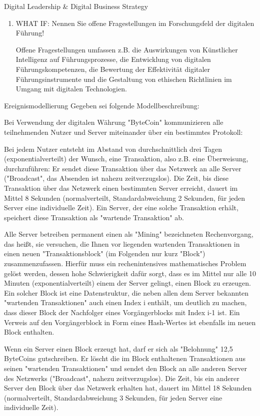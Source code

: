 \documentclass{article}
\begin{document}
\begin{exercise}{Digital Leadership \& Digital Business Strategy}
\begin{enumerate}
    \item WHAT IF: Nennen Sie offene Fragestellungen im Forschungsfeld der digitalen Führung!
          \begin{solution}
            Offene Fragestellungen umfassen z.B. die Auswirkungen von Künstlicher Intelligenz auf Führungsprozesse, die Entwicklung von digitalen Führungskompetenzen, die Bewertung der Effektivität digitaler Führungsinstrumente und die Gestaltung von ethischen Richtlinien im Umgang mit digitalen Technologien.
          \end{solution}
  \end{enumerate}
\end{exercise}



\begin{exercise}{Ereignismodellierung}
  Gegeben sei folgende Modellbeschreibung:
  \par Bei Verwendung der digitalen Währung "ByteCoin" kommunizieren alle teilnehmenden Nutzer und Server miteinander über ein bestimmtes Protokoll:
  \par Bei jedem Nutzer entsteht im Abstand von durchschnittlich drei Tagen (exponentialverteilt) der Wunsch, eine Transaktion, also z.B. eine Überweisung, durchzuführen: Er sendet diese Transaktion über das Netzwerk an alle Server ("Broadcast", das Absenden ist nahezu zeitverzugslos). Die Zeit, bis diese Transaktion über das Netzwerk einen bestimmten Server erreicht, dauert im Mittel 8 Sekunden (normalverteilt, Standardabweichung 2 Sekunden, für jeden Server eine individuelle Zeit). Ein Server, der eine solche Transaktion erhält, speichert diese Transaktion als "wartende Transaktion" ab.
  \par Alle Server betreiben permanent einen als "Mining" bezeichneten Rechenvorgang, das heißt, sie versuchen, die Ihnen vor liegenden wartenden Transaktionen in einen neuen "Transaktionsblock" (im Folgenden nur kurz "Block") zusammenzufassen. Hierfür muss ein rechenintensives mathematisches Problem gelöst werden, dessen hohe Schwierigkeit dafür sorgt, dass es im Mittel nur alle 10 Minuten (exponentialverteilt) einem der Server gelingt, einen Block zu erzeugen. Ein solcher Block ist eine Datenstruktur, die neben allen dem Server bekannten "wartenden Transaktionen" auch einen Index i enthält, um deutlich zu machen, dass dieser Block der Nachfolger eines Vorgängerblocks mit Index i-1 ist. Ein Verweis auf den Vorgängerblock in Form eines Hash-Wertes ist ebenfalls im neuen Block enthalten.
  \par Wenn ein Server einen Block erzeugt hat, darf er sich als "Belohnung" 12,5 ByteCoins gutschreiben. Er löscht die im Block enthaltenen Transaktionen aus seinen "wartenden Transaktionen" und sendet den Block an alle anderen Server des Netzwerks ("Broadcast", nahezu zeitverzugslos). Die Zeit, bis ein anderer Server den Block über das Netzwerk erhalten hat, dauert im Mittel 18 Sekunden (normalverteilt, Standardabweichung 3 Sekunden, für jeden Server eine individuelle Zeit).

\end{exercise}
\end{document}
